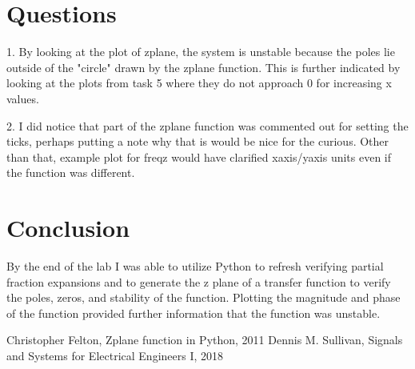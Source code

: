 \documentclass[12pt]{report}
\begin{document}
\section{Questions}
1. By looking at the plot of zplane, the system is unstable because the poles lie outside of the "circle" drawn by the zplane function. This is further indicated by looking at the plots from task 5 where they do not approach 0 for increasing x values.  

2. I did notice that part of the zplane function was commented out for setting the ticks, perhaps putting a note why that is would be nice for the curious. Other than that, example plot for freqz would have clarified xaxis/yaxis units even if the function was different. 
\newpage

\section{Conclusion}

By the end of the lab I was able to utilize Python to refresh verifying partial fraction expansions and to generate the z plane of a transfer function to verify the poles, zeros, and stability of the function. Plotting the magnitude and phase of the function provided further information that the function was unstable. 
\newpage


\begin{thebibliography}{111}
Christopher Felton,
Zplane function in Python,
2011
Dennis M. Sullivan,
Signals and Systems for Electrical Engineers I,
 2018
\end{thebibliography}
\end{document}
